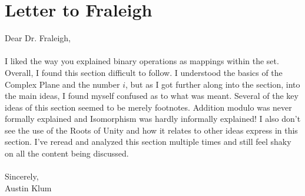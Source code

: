 \documentclass[11pt]{article}
\theoremstyle{plain}
\theoremstyle{definition}
\begin{document}
\section{Letter to Fraleigh}
Dear Dr. Fraleigh,\\
\\
I liked the way you explained binary operations as mappings within the set. Overall, I found this section difficult to follow. I understood the basics of the Complex Plane and the number $i$, but as I got further along into the section, into the main ideas, I found myself confused as to what was meant. Several of the key ideas of this section seemed to be merely footnotes. Addition modulo was never formally explained and Isomorphism was hardly informally explained! I also don't see the use of the Roots of Unity and how it relates to other ideas express in this section. I've reread and analyzed this section multiple times and still feel shaky on all the content being discussed.\\
\\
Sincerely,\\
Austin Klum
\end{document}
